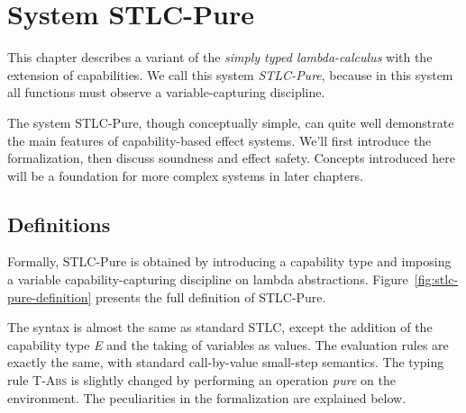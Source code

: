 \section{System STLC-Pure}

This chapter describes a variant of the \emph{simply typed
  lambda-calculus} with the extension of capabilities. We call this
system \emph{STLC-Pure}, because in this system all functions must
observe a variable-capturing discipline.


The system STLC-Pure, though conceptually simple, can quite well
demonstrate the main features of capability-based effect
systems. We'll first introduce the formalization, then discuss
soundness and effect safety. Concepts introduced here will be a
foundation for more complex systems in later chapters.

\subsection{Definitions}

Formally, STLC-Pure is obtained by introducing a capability type and
imposing a variable capability-capturing discipline on lambda
abstractions.  Figure~\ref{fig:stlc-pure-definition} presents the full
definition of STLC-Pure.

The syntax is almost the same as standard STLC, except the addition of
the capability type \emph{E} and the taking of variables as
values. The evaluation rules are exactly the same, with standard
call-by-value small-step semantics. The typing rule \textsc{T-Abs} is
slightly changed by performing an operation \emph{pure} on the
environment. The peculiarities in the formalization are explained
below.

